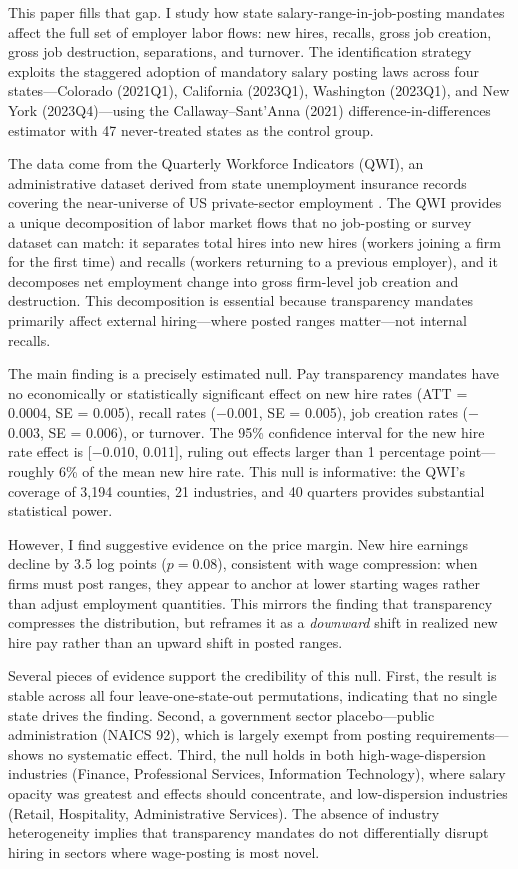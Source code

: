 \documentclass[12pt]{article}
\begin{document}
This paper fills that gap. I study how state salary-range-in-job-posting mandates affect the full set of employer labor flows: new hires, recalls, gross job creation, gross job destruction, separations, and turnover. The identification strategy exploits the staggered adoption of mandatory salary posting laws across four states---Colorado (2021Q1), California (2023Q1), Washington (2023Q1), and New York (2023Q4)---using the Callaway--Sant'Anna (2021) difference-in-differences estimator with 47 never-treated states as the control group.

The data come from the Quarterly Workforce Indicators (QWI), an administrative dataset derived from state unemployment insurance records covering the near-universe of US private-sector employment \citep{abowd2009qwi}. The QWI provides a unique decomposition of labor market flows that no job-posting or survey dataset can match: it separates total hires into new hires (workers joining a firm for the first time) and recalls (workers returning to a previous employer), and it decomposes net employment change into gross firm-level job creation and destruction. This decomposition is essential because transparency mandates primarily affect external hiring---where posted ranges matter---not internal recalls.

The main finding is a precisely estimated null. Pay transparency mandates have no economically or statistically significant effect on new hire rates (ATT = 0.0004, SE = 0.005), recall rates ($-$0.001, SE = 0.005), job creation rates ($-$0.003, SE = 0.006), or turnover. The 95\% confidence interval for the new hire rate effect is [$-$0.010, 0.011], ruling out effects larger than 1 percentage point---roughly 6\% of the mean new hire rate. This null is informative: the QWI's coverage of 3,194 counties, 21 industries, and 40 quarters provides substantial statistical power.

However, I find suggestive evidence on the price margin. New hire earnings decline by 3.5 log points ($p = 0.08$), consistent with wage compression: when firms must post ranges, they appear to anchor at lower starting wages rather than adjust employment quantities. This mirrors the \citet{cullen2024equilibrium} finding that transparency compresses the distribution, but reframes it as a \textit{downward} shift in realized new hire pay rather than an upward shift in posted ranges.

Several pieces of evidence support the credibility of this null. First, the result is stable across all four leave-one-state-out permutations, indicating that no single state drives the finding. Second, a government sector placebo---public administration (NAICS 92), which is largely exempt from posting requirements---shows no systematic effect. Third, the null holds in both high-wage-dispersion industries (Finance, Professional Services, Information Technology), where salary opacity was greatest and effects should concentrate, and low-dispersion industries (Retail, Hospitality, Administrative Services). The absence of industry heterogeneity implies that transparency mandates do not differentially disrupt hiring in sectors where wage-posting is most novel.
\end{document}
